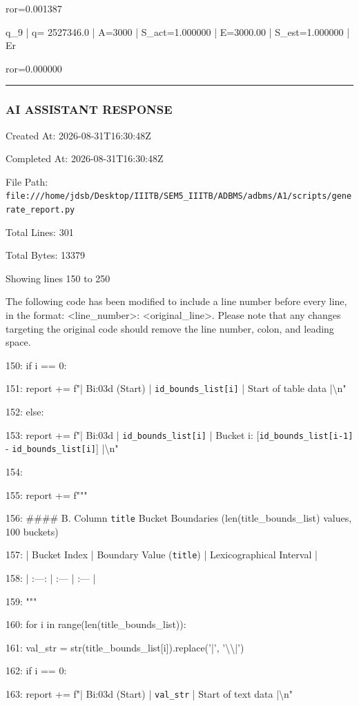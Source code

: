 \documentclass[11pt,a4paper]{article}
\begin{document}
ror=0.001387

q\_9 | q=   2527346.0 | A=3000 | S\_act=1.000000 | E=3000.00 | S\_est=1.000000 | Er

ror=0.000000


\hrule

\subsubsection{AI ASSISTANT RESPONSE}

Created At: 2026-08-31T16:30:48Z

Completed At: 2026-08-31T16:30:48Z

File Path: \texttt{file:///home/jdsb/Desktop/IIITB/SEM5\_IIITB/ADBMS/adbms/A1/scripts/generate\_report.py}

Total Lines: 301

Total Bytes: 13379

Showing lines 150 to 250

The following code has been modified to include a line number before every line, in the format: <line\_number>: <original\_line>. Please note that any changes targeting the original code should remove the line number, colon, and leading space.

150:         if i == 0:

151:             report += f"| B{i:03d} (Start) | \texttt{{id\_bounds\_list[i]}} | Start of table data |\textbackslash{}n"

152:         else:

153:             report += f"| B{i:03d} | \texttt{{id\_bounds\_list[i]}} | Bucket {i}: [\texttt{{id\_bounds\_list[i-1]}} - \texttt{{id\_bounds\_list[i]}}] |\textbackslash{}n"

154:

155:     report += f"""

156: \#\#\#\# B. Column \texttt{title} Bucket Boundaries ({len(title\_bounds\_list)} values, 100 buckets)

157: | Bucket Index | Boundary Value (\texttt{title}) | Lexicographical Interval |

158: | :---: | :--- | :--- |

159: """

160:     for i in range(len(title\_bounds\_list)):

161:         val\_str = str(title\_bounds\_list[i]).replace('|', '\textbackslash{}\textbackslash{}|')

162:         if i == 0:

163:             report += f"| B{i:03d} (Start) | \texttt{{val\_str}} | Start of text data |\textbackslash{}n"
\end{document}
